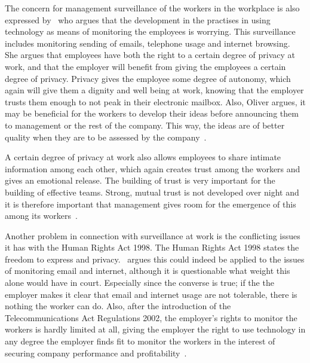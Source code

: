 \documentclass[a4paper,12pt,titlepage]{article}
\begin{document}
  The concern for management surveillance of the workers in the workplace
  is also expressed by~ who argues that the development
  in the practises in using technology as means of monitoring the
  employees is worrying. This surveillance includes monitoring sending of emails,
  telephone usage and internet browsing. She argues that employees
  have both the right to a certain degree of privacy at work, and that
  the employer will benefit from giving the employees a certain
  degree of privacy. Privacy
  gives the employee some degree of autonomy, which again will give
  them a dignity and well being at work, knowing that the employer
  trusts them enough to not peak in their electronic mailbox. Also, Oliver
  argues, it may be beneficial for the workers to develop their
  ideas before announcing them to management or the rest of the company.
  This way, the ideas are of better quality when they are to be assessed by 
  the company~\cite[322-352]{ho}.

  A certain degree of privacy at work also allows employees
  to share intimate information
  among each other, which again creates trust among the workers
  and gives an emotional release. The building of trust is
  very important for the building of effective teams. Strong, mutual
  trust is not developed over night and it is therefore important
  that management gives room for the emergence of this among its
  workers~\cite[294]{sr}.

  Another problem in connection with surveillance at work is
  the conflicting issues it has with the Human Rights Act 1998.
  The Human Rights Act 1998 states the
  freedom to express and privacy.~ 
  argues this could indeed be applied to the issues of monitoring email
  and internet, although it is questionable what weight this alone would
  have in court. Especially since the converse is true; if the
  the employer makes it clear that email and internet usage are
  not tolerable, there is nothing the worker can do. Also, after
  the introduction of the Telecommunications Act Regulations 2002,
  the employer's rights to monitor the workers is hardly limited
  at all, giving the employer the right to use technology
  in any degree the employer finds fit to monitor the workers
  in the interest of securing company performance and
  profitability~\cite[322-352]{ho}.
\end{document}
